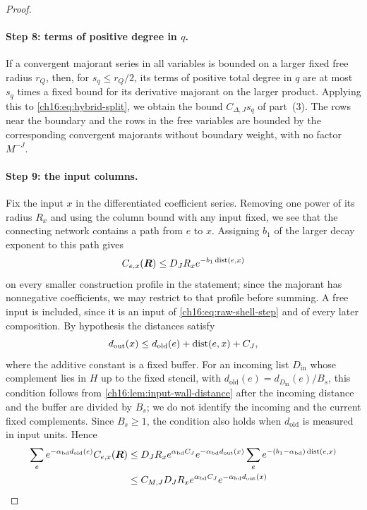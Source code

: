 \begin{proof}
\paragraph{Step 8: terms of positive degree in $q$.}
If a convergent majorant series in all variables is bounded on a larger fixed free radius $r_Q$, then, for $s_q\le r_Q/2$, its terms of positive total degree in $q$ are at most $s_q$ times a fixed bound for its derivative majorant on the larger product. Applying this to \eqref{ch16:eq:hybrid-split}, we obtain the bound $C_{\Delta,J}s_q$ of part~(3). The rows near the boundary and the rows in the free variables are bounded by the corresponding convergent majorants without boundary weight, with no factor $M^{-J}$.

\paragraph{Step 9: the input columns.}
Fix the input $x$ in the differentiated coefficient series. Removing one power of its radius $R_x$ and using the column bound with any input fixed, we see that the connecting network contains a path from $e$ to $x$. Assigning $b_1$ of the larger decay exponent to this path gives
\begin{equation}\label{ch16:eq:column-local}
 C_{e,x}(\boldsymbol R)\le D_JR_xe^{-b_1\operatorname{dist}(e,x)}
\end{equation}
on every smaller construction profile in the statement; since the majorant has nonnegative coefficients, we may restrict to that profile before summing. A free input is included, since it is an input of \eqref{ch16:eq:raw-shell-step} and of every later composition. By hypothesis the distances satisfy
\[
 d_{\mathrm{out}}(x)\le d_{\mathrm{old}}(e)+\operatorname{dist}(e,x)+C_J,
\]
where the additive constant is a fixed buffer. For an incoming list $D_{\mathrm{in}}$ whose complement lies in $H$ up to the fixed stencil, with $d_{\mathrm{old}}(e)=d_{D_{\mathrm{in}}}(e)/B_s$, this condition follows from \cref{ch16:lem:input-wall-distance} after the incoming distance and the buffer are divided by $B_s$; we do not identify the incoming and the current fixed complements. Since $B_s\ge1$, the condition also holds when $d_{\mathrm{old}}$ is measured in input units. Hence
\begin{align*}
 \sum_e e^{-\awall d_{\mathrm{old}}(e)}C_{e,x}(\boldsymbol R)
 &\le D_JR_xe^{\awall C_J}e^{-\awall d_{\mathrm{out}}(x)}
                    \sum_e e^{-(b_1-\awall)\dist(e,x)}\\
 &\le C_{M,J}D_JR_xe^{\awall C_J}e^{-\awall d_{\mathrm{out}}(x)}

\end{align*}
\end{proof}
